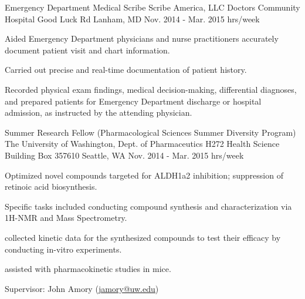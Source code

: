 \begin{cventries}
  \cventry
    {Emergency Department Medical Scribe} %
    {Scribe America, LLC } %
    {Doctors Community Hospital  Good Luck Rd \newline
Lanham, MD
} %
    {Nov. 2014 - Mar. 2015  hrs/week} %
    {
      \begin{cvitems} %
        \item {Aided Emergency Department physicians and nurse practitioners accurately document patient visit and chart information.}
        \item{Carried out precise and real-time documentation of patient history.}
        \item{Recorded physical exam findings, medical decision-making, differential diagnoses, and prepared patients for Emergency Department discharge or hospital admission, as instructed by the attending physician.}
      \end{cvitems}
    }



  \cventry
    {
Summer Research Fellow (Pharmacological Sciences Summer Diversity Program) }%
    {The University of Washington, Dept. of Pharmaceutics  } %
    {H272 Health Science Building \newline
Box 357610 \newline
Seattle, WA
} %
    {Nov. 2014 - Mar. 2015  hrs/week} %
    {
      \begin{cvitems} %
        \item {Optimized novel compounds targeted for ALDH1a2 inhibition; suppression of retinoic acid biosynthesis.}
        \item{Specific tasks included conducting compound synthesis and characterization via 1H-NMR and Mass Spectrometry.}
        \item{collected kinetic data for the synthesized compounds to test their efficacy by conducting in-vitro experiments.}
        \item{assisted with pharmacokinetic studies in mice.}
         \item{Supervisor: John Amory (\textcolor{navyblue}{
        {\underline{\href{mailto:jamory@uw.edu}{jamory@uw.edu}}}})}
      \end{cvitems}
    }


\end{cventries}
